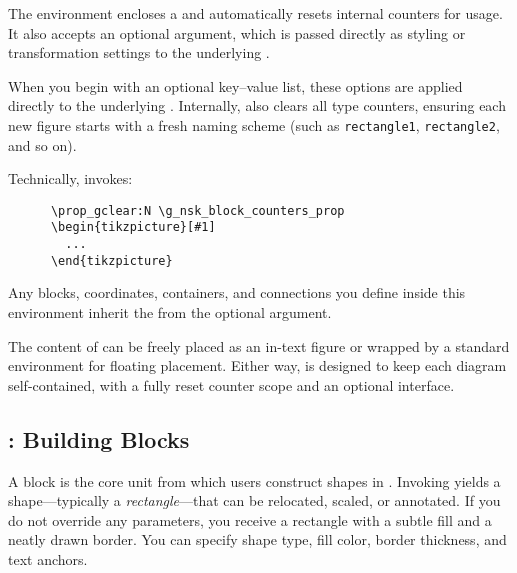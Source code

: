 \documentclass[show-experimental]{l3doc}
\begin{document}
\begin{function}{\nskFigure}
	\begin{syntax}
	\end{syntax}
	The  environment encloses a  and automatically
	resets internal counters for  usage. It also accepts an optional
	argument, which is passed directly as styling or transformation settings to the
	underlying .

	When you begin  with an optional key--value list, these options are
	applied directly to the underlying . Internally, 
	also clears all  type counters, ensuring each new figure starts with a
	fresh naming scheme (such as \texttt{rectangle1}, \texttt{rectangle2}, and so on).

	\begin{texnote}
		Technically,  invokes:
		\begin{verbatim}
      \prop_gclear:N \g_nsk_block_counters_prop
      \begin{tikzpicture}[#1]
        ...
      \end{tikzpicture}
    \end{verbatim}
		Any blocks, coordinates, containers, and connections you define inside this
		environment inherit the  from the optional argument.
	\end{texnote}

	The content of  can be freely placed as an in-text figure or wrapped
	by a standard  environment for floating placement. Either way,
	 is designed to keep each diagram self-contained, with a fully reset
	 counter scope and an optional  interface.

\end{function}

\subsection{\texorpdfstring{}{}: Building Blocks}
A block is the core unit from which users construct shapes in . Invoking  yields a shape—typically a \emph{rectangle}—that can be relocated, scaled, or annotated. If you do not override any parameters, you receive a rectangle with a subtle fill and a neatly drawn border. You can specify shape type, fill color, border thickness, and text anchors.
\end{document}
